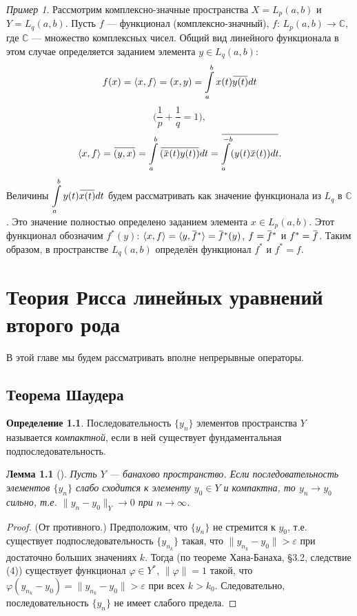 \documentclass[12pt,a4paper,titlepage,oneside]{book}
\newcommand{\overbar}[1]{\mkern 1.5mu\overline{\mkern-1.5mu#1\mkern-1.5mu}\mkern 1.5mu}
\newcommand{\rom}[1]{\uppercase\expandafter{\romannumeral #1\relax}}
\theoremstyle{definition}
\newtheorem*{definition}{Определение}
\theoremstyle{plain}
\theoremstyle{break}
\theoremstyle{remark}
\theoremstyle{remark}
\newtheorem*{example}{Пример}
\theoremstyle{remark}
\theoremstyle{remark}
\theoremstyle{plain}
\newtheorem*{lemma}{Лемма}
\theoremstyle{plain}
\begin{document}
\begin{example}
Рассмотрим комплексно-значные пространства $X=L_p(a,b)$ и $Y=L_q(a,b)$. Пусть $f$ --- функционал (комплексно-значный), $f$: $L_p(a,b) \to \mathbb{C}$, где $\mathbb{C}$ --- множество комплексных чисел. Общий вид линейного функционала в этом случае определяется заданием элемента $y \in L_q(a,b)$:
$$f(x) = \langle x, f \rangle = (x,y) = \displaystyle\int\limits_a^b x(t)\overbar{y(t)}dt$$
$$\Big( \frac{1}{p} + \frac{1}{q} = 1 \Big),$$
$$ \langle x, f \rangle  = \overbar{(y,x)}  = \displaystyle\int\limits_a^b \overbar{(\overbar{x}(t)y(t))} dt = \overbar{\displaystyle\int\limits_a^{-b} (y(t)\overbar{x}(t))dt}.$$
Величины $\displaystyle\int\limits_a^b y(t)\overbar{x(t)} dt$ будем рассматривать как значение функционала из $L_q$ в $\mathbb{C}$. Это значение полностью определено заданием элемента $x \in L_p(a,b)$. Этот функционал обозначим $f^{*}(y)$:
$\langle x,f \rangle = \langle y,\overbar{f}^{*} \rangle = \overbar{f}^{*}(y)$, $f=\overbar{f}^{*}$ и $f^{*}=\overbar{f}$.
Таким образом, в пространстве $L_q(a,b)$ определён функционал $f^{*}$ и $f^{*}=f$.
\end{example}

\chapter{Теория Рисса линейных уравнений второго рода}

В этой главе мы будем рассматривать вполне непрерывные операторы.

\section{Теорема Шаудера}

\begin{definition}
Последовательность $\{y_n\}$ элементов пространства $Y$ называется \textit{компактной}, если в ней существует фундаментальная подпоследовательность.
\end{definition}

\begin{lemma}[\rom{1}]
Пусть $Y$ --- банахово пространство. Если последовательность элементов $\{y_n\}$ слабо сходится к элементу $y_0 \in Y$ и компактна, то $y_n\to y_0$ сильно, т.е. \mbox{$\lVert y_n - y_0\rVert_Y\to 0$} при $n\to\infty$.
\end{lemma}

\begin{proof}
(От противного.) Предположим, что $\{y_n\}$ не стремится к $y_0$, т.е. существует подпоследовательность $\{y_{n_k}\}$ такая, что $\lVert  y_{n_k} - y_0 \rVert > \varepsilon$ при достаточно больших значениях $k$. Тогда (по теореме Хана-Банаха, \S 3.2, следствие (4)) существует функционал $\varphi\in Y^*$, $\lVert\varphi\rVert=1$ такой, что $\varphi(y_{n_k} - y_0) = \lVert y_{n_k} - y_0 \rVert > \varepsilon$ при всех $k > k_0$. Следовательно, последовательность $\{y_n\}$ не имеет слабого предела.
\end{proof}
\end{document}
